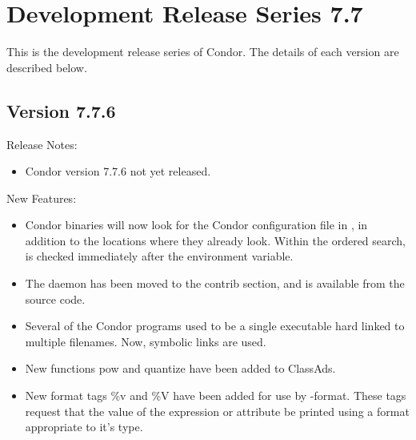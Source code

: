 
\section{\label{sec:History-7-7}Development Release Series 7.7}

This is the development release series of Condor.
The details of each version are described below.

\subsection*{\label{sec:New-7-7-6}Version 7.7.6}

\noindent Release Notes:

\begin{itemize}

\item Condor version 7.7.6 not yet released.

\end{itemize}


\noindent New Features:

\begin{itemize}

\item Condor binaries will now look for the Condor configuration file in
, in addition to the locations where
they already look.
Within the ordered search,
 is checked immediately after the 
 environment variable.

\item The  daemon has been moved to the contrib section, and is 
available from the source code.

\item Several of the Condor programs used to be a single executable
hard linked to multiple filenames. Now, symbolic links are used.

\item New functions pow and quantize have been added to ClassAds.

\item New format tags \%v and \%V have been added for use by  -format.
These tags request that the value of the expression or attribute be printed using
a format appropriate to it's type.

\end{itemize}

